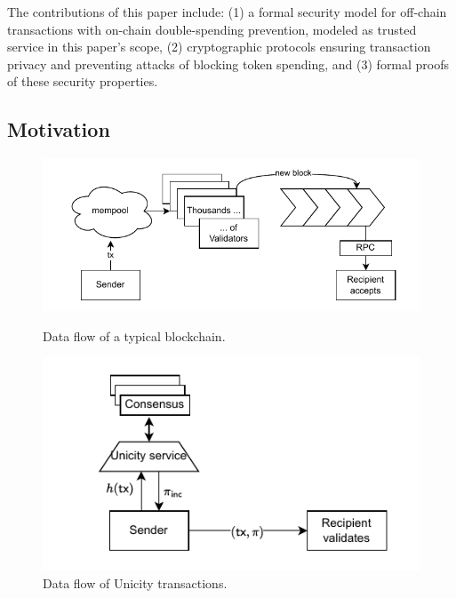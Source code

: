 \documentclass{article}
\begin{document}
The contributions of this paper include: (1) a formal security model for off-chain transactions with on-chain double-spending prevention, modeled as trusted service in this paper's scope, (2) cryptographic protocols ensuring transaction privacy and preventing attacks of blocking token spending, and (3) formal proofs of these security properties.

\subsection{Motivation}

\begin{figure}[!htbp]
 \begin{minipage}[h]{0.55\linewidth}
        \centering
                \includegraphics[width=\columnwidth]{pic/traditional.drawio}
                \caption{Data flow of a typical blockchain.} \label{fi:traditional}
    \end{minipage}
    \hfill
    \begin{minipage}[h]{0.44\linewidth}
        \centering
                \includegraphics[width=\columnwidth]{pic/unicity.drawio}
                \caption{Data flow of Unicity transactions.}\label{fi:unicity}
    \end{minipage}
\end{figure}
\end{document}
